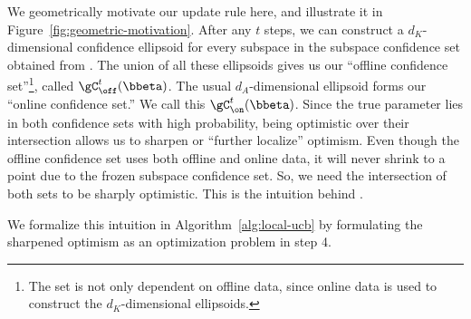 We geometrically motivate our update rule here, and illustrate it in Figure~\ref{fig:geometric-motivation}. After any $t$ steps, we can construct a $d_K$-dimensional confidence ellipsoid for every subspace in the subspace confidence set obtained from . The union of all these ellipsoids gives us our ``offline confidence set''\footnote{The set is not only dependent on offline data, since online data is used to construct the $d_K$-dimensional ellipsoids.}, called $\gC^t_{\off}(\bbeta)$. The usual $d_A$-dimensional ellipsoid forms our ``online confidence set.'' We call this $\gC^t_{\on}(\bbeta)$. Since the true parameter lies in both confidence sets with high probability, being optimistic over their intersection allows us to sharpen or ``further localize'' optimism. Even though the offline confidence set uses both offline and online data, it will never shrink to a point due to the frozen subspace confidence set. So, we need the intersection of both sets to be sharply optimistic. This is the intuition behind .


We formalize this intuition in Algorithm~\ref{alg:local-ucb} by formulating the sharpened optimism as an optimization problem in step 4.


